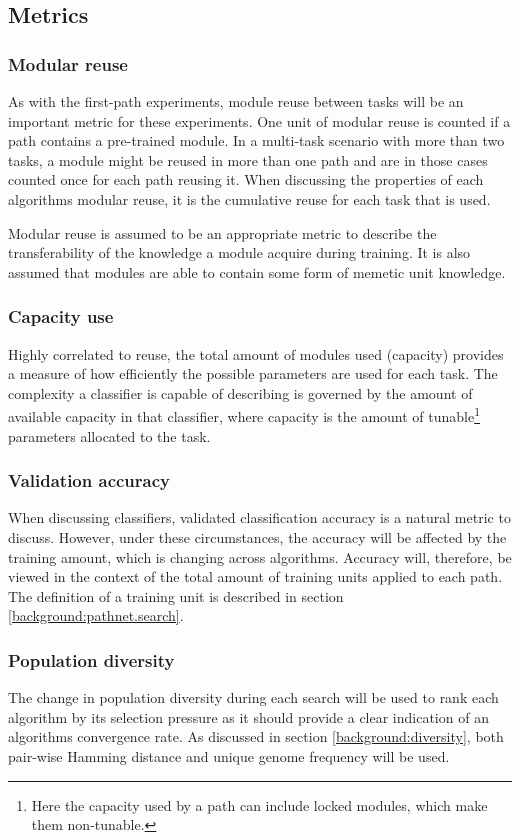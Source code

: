 \subsection{Metrics}
\label{exp2:metrics}

\subsubsection{Modular reuse}
As with the first-path experiments, module reuse between tasks will be an important metric for these experiments. One unit of modular reuse is counted if a path contains a pre-trained module. In a multi-task scenario with more than two tasks, a module might be reused in more than one path and are in those cases counted once for each path reusing it. When discussing the properties of each algorithms modular reuse, it is the cumulative reuse for each task that is used.

Modular reuse is assumed to be an appropriate metric to describe the transferability of the knowledge a module acquire during training. It is also assumed that modules are able to contain some form of memetic unit knowledge.

\subsubsection{Capacity use}
Highly correlated to reuse, the total amount of modules used (capacity) provides a measure of how efficiently the possible parameters are used for each task. The complexity a classifier is capable of describing is governed by the amount of available capacity in that classifier, where capacity is the amount of tunable\footnote{Here the capacity used by a path can include locked modules, which make them non-tunable.} parameters allocated to the task.

\subsubsection{Validation accuracy}
When discussing classifiers, validated classification accuracy is a natural metric to discuss. However, under these circumstances, the accuracy will be affected by the training amount, which is changing across algorithms. Accuracy will, therefore, be viewed in the context of the total amount of training units applied to each path. The definition of a training unit is described in section \ref{background:pathnet.search}.

\subsubsection{Population diversity}
The change in population diversity during each search will be used to rank each algorithm by its selection pressure as it should provide a clear indication of an algorithms convergence rate. As discussed in section \ref{background:diversity}, both pair-wise Hamming distance and unique genome frequency will be used.

